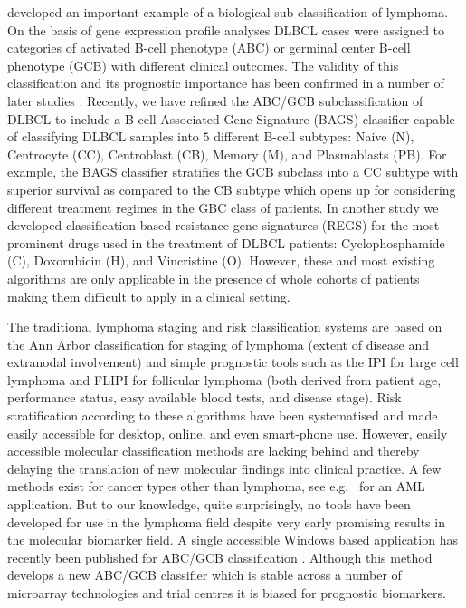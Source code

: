 \documentclass{article}
\begin{document}
\citet{Alizadeh2000} developed an important example of a biological sub-classification of lymphoma.
On the basis of gene expression profile analyses DLBCL cases were assigned to categories of activated B-cell phenotype (ABC) or germinal center B-cell phenotype (GCB) with different clinical outcomes.
The validity of this classification and its prognostic importance has been confirmed in a number of later studies \citep{Rosenwald2002a,Hans2004,Poulsen2005,Lenz2008a,Monti2012a}.
Recently, we have refined the ABC/GCB subclassification of DLBCL to include a B-cell Associated Gene Signature (BAGS) classifier capable of classifying DLBCL samples into $5$ different B-cell subtypes: Naive (N), Centrocyte (CC), Centroblast (CB), Memory (M), and Plasmablasts (PB).
For example, the BAGS classifier stratifies the GCB subclass into a CC subtype with superior survival as compared to the CB subtype \citep{DybkaerBoegsted2015} which opens up for considering different treatment regimes in the GBC class of patients.
In another study \citep{Falgreen2015} we developed classification based resistance gene signatures (REGS) for the most prominent drugs used in the treatment of DLBCL patients: Cyclophosphamide (C), Doxorubicin (H), and Vincristine (O).
However, these and most existing algorithms are only applicable in the presence of whole cohorts of patients making them difficult to apply in a clinical setting.

The traditional lymphoma staging and risk classification systems are based on the Ann Arbor classification for staging of lymphoma (extent of disease and extranodal involvement) and simple prognostic tools such as the IPI for large cell lymphoma and FLIPI for follicular lymphoma (both derived from patient age, performance status, easy available blood tests, and disease stage).
Risk stratification according to these algorithms have been systematised and made easily accessible for desktop, online, and even smart-phone use.
However, easily accessible molecular classification methods are lacking behind and thereby delaying the translation of new molecular findings into clinical practice.
A few methods exist for cancer types other than lymphoma, see e.g.\ \citep{Huang2009} for an AML application.
But to our knowledge, quite surprisingly, no tools have been developed for use in the lymphoma field despite very early promising results in the molecular biomarker field.
A single accessible Windows based application has recently been published for ABC/GCB classification \citep{Care2013}.
Although this method develops a new ABC/GCB classifier which is stable across a number of microarray technologies and trial centres it is biased for prognostic biomarkers.
\end{document}

